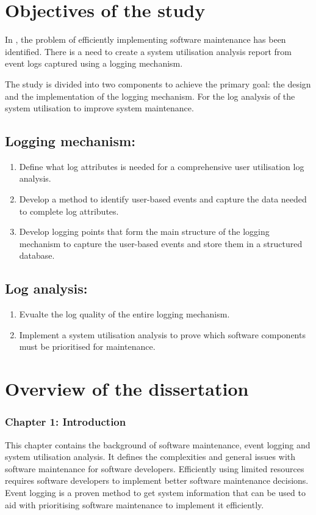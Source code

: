 \section{Objectives of the study}\label{sec:ch1_objectives}
In , the problem of efficiently implementing software maintenance has been identified. There is a need to create a system utilisation analysis report from event logs captured using a logging mechanism. \par The study is divided into two components to achieve the primary goal: the design and the implementation of the logging mechanism. For the log analysis of the system utilisation to improve system maintenance.

\subsection{Logging mechanism:}\label{sec:ch1_osLogging}
\begin{enumerate}
	\item Define what log attributes is needed for a comprehensive user utilisation log analysis.
	\item Develop a method to identify user-based events and capture the data needed to complete log attributes.
	\item Develop logging points that form the main structure of the logging mechanism to capture the user-based events and store them in a structured database.
\end{enumerate}

\subsection{Log analysis:}\label{sec:ch1_osAnalysis}
\begin{enumerate}
	\item Evualte the log quality of the entire logging mechanism.
	\item Implement a system utilisation analysis to prove which software components must be prioritised for maintenance.
\end{enumerate}

\section{Overview of the dissertation}
\subsubsection{Chapter 1: Introduction}
This chapter contains the background of software maintenance, event logging and system utilisation analysis. It defines the complexities and general issues with software maintenance for software developers. Efficiently using limited resources requires software developers to implement better software maintenance decisions. Event logging is a proven method to get system information that can be used to aid with prioritising software maintenance to implement it efficiently.

